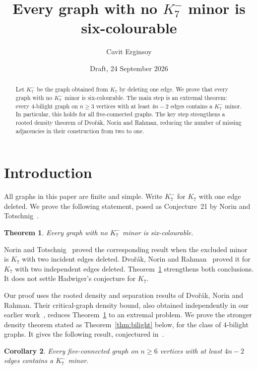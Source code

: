 \documentclass[11pt,a4paper]{amsart}
\title[Graphs with no \(K_7^{-}\) minor]{Every graph with no \(K_7^{-}\) minor is six-colourable}
\author{Cavit Erginsoy}
\date{Draft, 24 September 2026}
\newtheorem{theorem}{Theorem}[section]
\newtheorem{corollary}[theorem]{Corollary}
\theoremstyle{definition}
\theoremstyle{remark}
\begin{document}
\begin{abstract}
Let $K_7^{-}$ be the graph obtained from $K_7$ by deleting one edge.
We prove that every graph with no $K_7^{-}$ minor is six-colourable.
The main step is an extremal theorem: every $4$-bilight graph on $n\geq3$
vertices with at least $4n-2$ edges contains a $K_7^{-}$ minor.
In particular, this holds for all five-connected graphs.
The key step strengthens a rooted density theorem of
Dvo\v r\'ak, Norin and Rahman, reducing the number of missing
adjacencies in their construction from two to one.
\end{abstract}
\maketitle

\section{Introduction}
All graphs in this paper are finite and simple. Write $K_7^{-}$ for
$K_7$ with one edge deleted. We prove the following statement, posed as
Conjecture~21 by Norin and Totschnig~\cite{NT2025}.

\begin{theorem}\label{thm:colour}
Every graph with no $K_7^{-}$ minor is six-colourable.
\end{theorem}

Norin and Totschnig~\cite{NT2025} proved the corresponding result when
the excluded minor is $K_7$ with two incident edges deleted.
Dvo\v r\'ak, Norin and Rahman~\cite{DNR2026} proved it for $K_7$ with
two independent edges deleted. Theorem~\ref{thm:colour} strengthens
both conclusions. It does not settle Hadwiger's conjecture for $K_7$.

Our proof uses the rooted density and separation results
of Dvo\v r\'ak, Norin and Rahman. Their critical-graph density bound,
also obtained independently in our earlier work~\cite[Corollary~3]{Erginsoy2026critical},
reduces Theorem~\ref{thm:colour} to an extremal problem. We prove the
stronger density theorem stated as Theorem~\ref{thm:bilight} below,
for the class of $4$-bilight graphs. It gives the following result,
conjectured in~\cite[Conjecture~1.5]{DNR2026}.

\begin{corollary}\label{thm:five-connected}
Every five-connected graph on $n\geq6$ vertices with at least $4n-2$
edges contains a $K_7^{-}$ minor.
\end{corollary}
\end{document}
